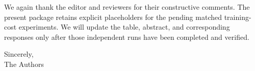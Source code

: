 \documentclass[11pt,a4paper]{article}
\begin{document}
\enlargethispage{3\baselineskip}
\vspace{0.5em}
We again thank the editor and reviewers for their constructive comments. The present package retains explicit placeholders for the pending matched training-cost experiments. We will update the table, abstract, and corresponding responses only after those independent runs have been completed and verified.

\begin{flushright}
Sincerely,\\
The Authors
\end{flushright}
\end{document}
